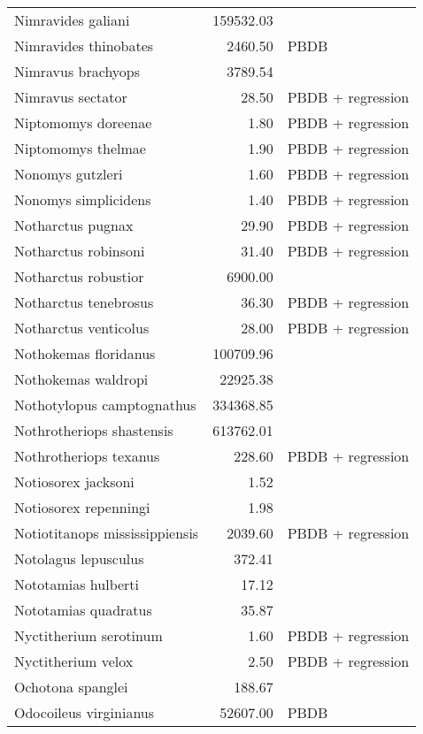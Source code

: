 \begin{table}[ht]
\begin{tabular}{lrl}
  Nimravides galiani & 159532.03 & \cite{Tomiya2013} \\ 
  Nimravides thinobates & 2460.50 & PBDB \\ 
  Nimravus brachyops & 3789.54 & \cite{Tomiya2013} \\ 
  Nimravus sectator & 28.50 & PBDB + regression \\ 
  Niptomomys doreenae & 1.80 & PBDB + regression \\ 
  Niptomomys thelmae & 1.90 & PBDB + regression \\ 
  Nonomys gutzleri & 1.60 & PBDB + regression \\ 
  Nonomys simplicidens & 1.40 & PBDB + regression \\ 
  Notharctus pugnax & 29.90 & PBDB + regression \\ 
  Notharctus robinsoni & 31.40 & PBDB + regression \\ 
  Notharctus robustior & 6900.00 & \cite{Soligo2006} \\ 
  Notharctus tenebrosus & 36.30 & PBDB + regression \\ 
  Notharctus venticolus & 28.00 & PBDB + regression \\ 
  Nothokemas floridanus & 100709.96 & \cite{Tomiya2013} \\ 
  Nothokemas waldropi & 22925.38 & \cite{Tomiya2013} \\ 
  Nothotylopus camptognathus & 334368.85 & \cite{Tomiya2013} \\ 
  Nothrotheriops shastensis & 613762.01 & \cite{Brook2004a} \\ 
  Nothrotheriops texanus & 228.60 & PBDB + regression \\ 
  Notiosorex jacksoni & 1.52 & \cite{Madden1985} \\ 
  Notiosorex repenningi & 1.98 & \cite{Lillegraven1977} \\ 
  Notiotitanops mississippiensis & 2039.60 & PBDB + regression \\ 
  Notolagus lepusculus & 372.41 & \cite{Tomiya2013} \\ 
  Nototamias hulberti & 17.12 & \cite{Tomiya2013} \\ 
  Nototamias quadratus & 35.87 & \cite{Tomiya2013} \\ 
  Nyctitherium serotinum & 1.60 & PBDB + regression \\ 
  Nyctitherium velox & 2.50 & PBDB + regression \\ 
  Ochotona spanglei & 188.67 & \cite{Tomiya2013} \\ 
  Odocoileus virginianus & 52607.00 & PBDB \\ 

\end{tabular}
\end{table}
